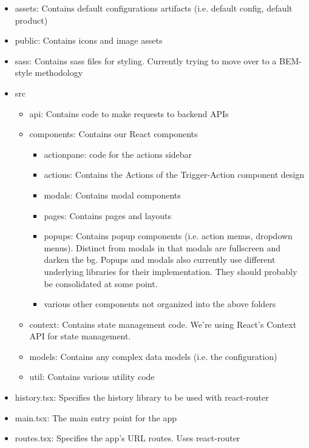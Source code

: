 \begin{itemize}
\tightlist
\item
  assets: Contains default configurations artifacts (i.e. default
  config, default product)
\item
  public: Contains icons and image assets
\item
  sass: Contains sass files for styling. Currently trying to move over
  to a BEM-style methodology
\item
  src

  \begin{itemize}
  \item
    api: Contains code to make requests to backend APIs
  \item
    components: Contains our React components

    \begin{itemize}
    \tightlist
    \item
      actionpane: code for the actions sidebar
    \item
      actions: Contains the Actions of the Trigger-Action component
      design
    \item
      modals: Contains modal components
    \item
      pages: Contains pages and layouts
    \item
      popups: Contains popup components (i.e. action menus, dropdown
      menus). Distinct from modals in that modals are fullscreen and
      darken the bg. Popups and modals also currently use different
      underlying libraries for their implementation. They should
      probably be consolidated at some point.
    \item
      various other components not organized into the above folders
    \end{itemize}
  \item
    context: Contains state management code. We're using React's Context
    API for state management.
  \item
    models: Contains any complex data models (i.e. the configuration)
  \item
    util: Contains various utility code
  \end{itemize}
\item
  history.tsx: Specifies the history library to be used with
  react-router
\item
  main.tsx: The main entry point for the app
\item
  routes.tsx: Specifies the app's URL routes. Uses react-router
\end{itemize}
